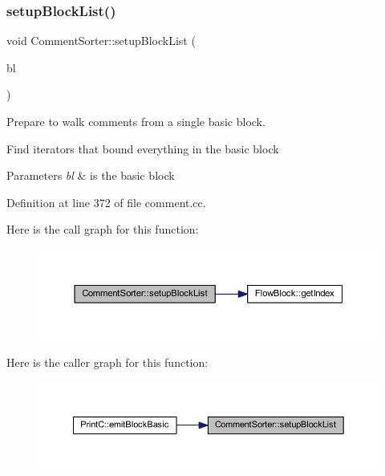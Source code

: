 \subsubsection{\texorpdfstring{setupBlockList()}{setupBlockList()}}
{\footnotesize\ttfamily void Comment\+Sorter\+::setup\+Block\+List (\begin{DoxyParamCaption}\item[{const \mbox{\hyperlink{class_flow_block}{Flow\+Block}} $\ast$}]{bl }\end{DoxyParamCaption})}



Prepare to walk comments from a single basic block. 

Find iterators that bound everything in the basic block


\begin{DoxyParams}{Parameters}
{\em bl} & is the basic block \\
\hline
\end{DoxyParams}


Definition at line 372 of file comment.\+cc.

Here is the call graph for this function\+:
\nopagebreak
\begin{figure}[H]
\begin{center}
\leavevmode
\includegraphics[width=350pt]{class_comment_sorter_ac16fb35aebd4c38915061a3d68313d9e_cgraph}
\end{center}
\end{figure}
Here is the caller graph for this function\+:
\nopagebreak
\begin{figure}[H]
\begin{center}
\leavevmode
\includegraphics[width=350pt]{class_comment_sorter_ac16fb35aebd4c38915061a3d68313d9e_icgraph}
\end{center}
\end{figure}
\mbox{\label{class_comment_sorter_a9a79bd6eaeaa2dc69a3cb8246097343a}} 
